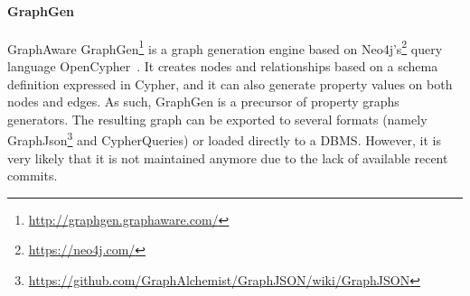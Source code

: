 
\paragraph{GraphGen}  GraphAware GraphGen\footnote{\url{http://graphgen.graphaware.com/}} is a graph generation engine based on Neo4j's\footnote{\url{https://neo4j.com/}} query language OpenCypher~\cite{GraphGen}.  It creates nodes and relationships based on a schema definition expressed in Cypher, and it can also generate property values on both
nodes and edges. As such, GraphGen is a precursor of property graphs generators. The resulting graph can be exported to several formats (namely GraphJson\footnote{\url{https://github.com/GraphAlchemist/GraphJSON/wiki/GraphJSON}} and CypherQueries) or loaded directly to a DBMS. However, it is very likely that it is not maintained anymore due to the lack of available recent commits.

